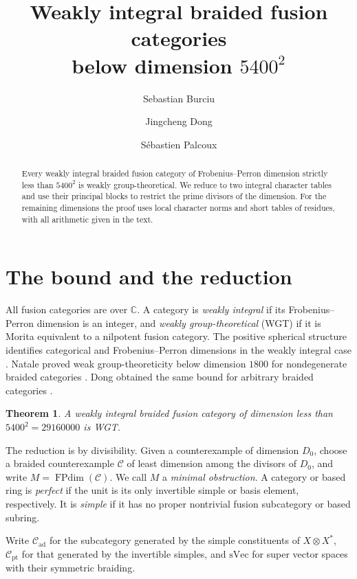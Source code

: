\documentclass[11pt,a4paper]{article}
\title{Weakly integral braided fusion categories\\ below dimension \texorpdfstring{$5400^2$}{5400 squared}}
\author{Sebastian Burciu \and Jingcheng Dong \and S\'ebastien Palcoux}
\date{}
\numberwithin{equation}{section}
\newtheorem{theorem}{Theorem}[section]
\theoremstyle{remark}
\newcommand{\C}{\mathcal C}
\newcommand{\FPdim}{\operatorname{FPdim}}
\newcommand{\ad}{\mathrm{ad}}
\newcommand{\pt}{\mathrm{pt}}
\newcommand{\CC}{\mathbb C}
\newcommand{\sVec}{\mathrm{sVec}}
\begin{document}
\maketitle
\begin{abstract}
Every weakly integral braided fusion category of Frobenius--Perron dimension
strictly less than $5400^2$ is weakly group-theoretical. We reduce to two
integral character tables and use their principal blocks to restrict the prime
divisors of the dimension. For the remaining dimensions the proof uses local
character norms and short tables of residues, with all arithmetic given in the text.
\end{abstract}

\section{The bound and the reduction}
All fusion categories are over $\CC$. A category is \emph{weakly integral}
if its Frobenius--Perron dimension is an integer, and \emph{weakly
group-theoretical} (WGT) if it is Morita equivalent to a nilpotent fusion
category. The positive spherical structure identifies categorical and
Frobenius--Perron dimensions in the weakly integral case
\cite[Propositions~8.23 and~8.24]{ENOannals}.
Natale proved weak group-theoreticity below dimension $1800$ for nondegenerate
braided categories \cite[Theorem~8.1]{NataleWGT}. Dong obtained the same bound for arbitrary braided categories \cite[Corollary~3.2]{DongWeakIntegral}.

\begin{theorem}\label{short:main}
A weakly integral braided fusion category of dimension less than $5400^2=29160000$ is WGT.
\end{theorem}

The reduction is by divisibility. Given a counterexample of dimension $D_0$,
choose a braided counterexample $\C$ of least dimension among the divisors
of $D_0$, and write $M=\FPdim(\C)$. We call $M$ a \emph{minimal
obstruction}. A category or based ring is \emph{perfect} if the unit is
its only invertible simple or basis element, respectively. It is
\emph{simple} if it has no proper nontrivial fusion subcategory or based subring.

Write $\C_{\ad}$ for the subcategory generated by the simple constituents
of $X\otimes X^*$, $\C_{\pt}$ for that generated by the invertible simples,
and $\sVec$ for super vector spaces with their symmetric braiding.
\end{document}
